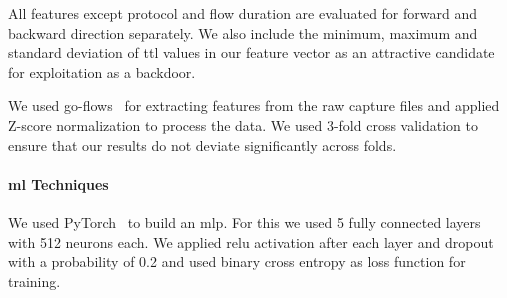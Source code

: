 \documentclass[9pt,sigconf,letterpaper,dvipsnames\ifx\removeHeaders\tempYes ,nonacm\fi]{acmart}
\begin{document}
All features except protocol and flow duration are evaluated for forward and backward direction separately.
We also include the minimum, maximum and standard deviation of \gls{ttl} values in our feature vector as an attractive candidate for exploitation as a backdoor. %

We used go-flows~\cite{vormayr_go-flows_2019}
for extracting features from the raw capture files and applied Z-score normalization to process the data. We used 3-fold cross validation to ensure that our results do not deviate significantly across folds.


\paragraph{\gls{ml} Techniques}
We used PyTorch~\cite{paszke_automatic_2017} to build an \gls{mlp}.
For this we used 5 fully connected layers with 512 neurons each. We applied \gls{relu} activation after each layer and dropout with a probability of 0.2 and used binary cross entropy  as loss function for training. %
\end{document}
